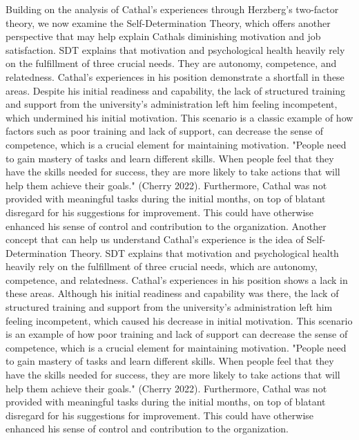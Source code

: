 \documentclass[12pt]{article}
\begin{document}
\begin{flushleft}
\hspace{\parindent} Building on the analysis of Cathal's experiences through Herzberg's two-factor theory, we now examine the Self-Determination Theory, which offers another perspective that may help explain Cathals diminishing motivation and job satisfaction. SDT explains that motivation and psychological health heavily rely on the fulfillment of three crucial needs. They are autonomy, competence, and relatedness. Cathal's experiences in his position demonstrate a shortfall in these areas. Despite his initial readiness and capability, the lack of structured training and support from the university's administration left him feeling incompetent, which undermined his initial motivation. This scenario is a classic example of how factors such as poor training and lack of support, can decrease the sense of competence, which is a crucial element for maintaining motivation. "People need to gain mastery of tasks and learn different skills. When people feel that they have the skills needed for success, they are more likely to take actions that will help them achieve their goals." (Cherry 2022). Furthermore, Cathal was not provided with meaningful tasks during the initial months, on top of blatant disregard for his suggestions for improvement. This could have otherwise enhanced his sense of control and contribution to the organization.
\bigbreak \noindent 
\hspace{\parindent} Another concept that can help us understand Cathal's experience is the idea of Self-Determination Theory. SDT explains that motivation and psychological health heavily rely on the fulfillment of three crucial needs, which are autonomy, competence, and relatedness. Cathal's experiences in his position shows a lack in these areas. Although his initial readiness and capability was there, the lack of structured training and support from the university's administration left him feeling incompetent, which caused his decrease in initial motivation. This scenario is an example of how poor training and lack of support can decrease the sense of competence, which is a crucial element for maintaining motivation. "People need to gain mastery of tasks and learn different skills. When people feel that they have the skills needed for success, they are more likely to take actions that will help them achieve their goals." (Cherry 2022). Furthermore, Cathal was not provided with meaningful tasks during the initial months, on top of blatant disregard for his suggestions for improvement. This could have otherwise enhanced his sense of control and contribution to the organization.

\end{flushleft}
\end{document}
